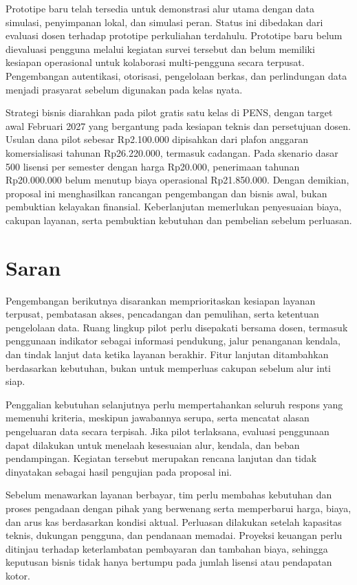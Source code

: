 \documentclass[12pt,a4paper,oneside]{report}
\begin{document}
Prototipe baru telah tersedia untuk demonstrasi alur utama dengan data simulasi, penyimpanan lokal, dan simulasi peran. Status ini dibedakan dari evaluasi dosen terhadap prototipe perkuliahan terdahulu. Prototipe baru belum dievaluasi pengguna melalui kegiatan survei tersebut dan belum memiliki kesiapan operasional untuk kolaborasi multi-pengguna secara terpusat. Pengembangan autentikasi, otorisasi, pengelolaan berkas, dan perlindungan data menjadi prasyarat sebelum digunakan pada kelas nyata.

Strategi bisnis diarahkan pada pilot gratis satu kelas di PENS, dengan target awal Februari 2027 yang bergantung pada kesiapan teknis dan persetujuan dosen. Usulan dana pilot sebesar Rp2.100.000 dipisahkan dari plafon anggaran komersialisasi tahunan Rp26.220.000, termasuk cadangan. Pada skenario dasar 500 lisensi per semester dengan harga Rp20.000, penerimaan tahunan Rp20.000.000 belum menutup biaya operasional Rp21.850.000. Dengan demikian, proposal ini menghasilkan rancangan pengembangan dan bisnis awal, bukan pembuktian kelayakan finansial. Keberlanjutan memerlukan penyesuaian biaya, cakupan layanan, serta pembuktian kebutuhan dan pembelian sebelum perluasan.

\section{Saran}
Pengembangan berikutnya disarankan memprioritaskan kesiapan layanan terpusat, pembatasan akses, pencadangan dan pemulihan, serta ketentuan pengelolaan data. Ruang lingkup pilot perlu disepakati bersama dosen, termasuk penggunaan indikator sebagai informasi pendukung, jalur penanganan kendala, dan tindak lanjut data ketika layanan berakhir. Fitur lanjutan ditambahkan berdasarkan kebutuhan, bukan untuk memperluas cakupan sebelum alur inti siap.

Penggalian kebutuhan selanjutnya perlu mempertahankan seluruh respons yang memenuhi kriteria, meskipun jawabannya serupa, serta mencatat alasan pengeluaran data secara terpisah. Jika pilot terlaksana, evaluasi penggunaan dapat dilakukan untuk menelaah kesesuaian alur, kendala, dan beban pendampingan. Kegiatan tersebut merupakan rencana lanjutan dan tidak dinyatakan sebagai hasil pengujian pada proposal ini.

Sebelum menawarkan layanan berbayar, tim perlu membahas kebutuhan dan proses pengadaan dengan pihak yang berwenang serta memperbarui harga, biaya, dan arus kas berdasarkan kondisi aktual. Perluasan dilakukan setelah kapasitas teknis, dukungan pengguna, dan pendanaan memadai. Proyeksi keuangan perlu ditinjau terhadap keterlambatan pembayaran dan tambahan biaya, sehingga keputusan bisnis tidak hanya bertumpu pada jumlah lisensi atau pendapatan kotor.
\end{document}
